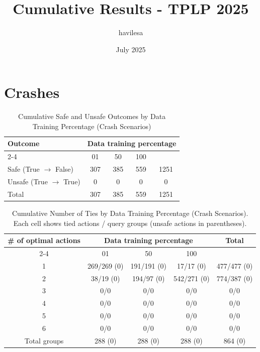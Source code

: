 \documentclass{article}
\title{Cumulative Results - TPLP 2025}
\author{havilesa}
\date{July 2025}
\begin{document}
\maketitle

\section{Crashes}
\begin{table}[h]
\centering
\caption{Cumulative Safe and Unsafe Outcomes by Data Training Percentage (Crash Scenarios)}
\begin{tabular}{l|ccc|c}
\toprule
\multirow{2}{*}{Outcome} & \multicolumn{5}{c|}{Data training percentage} & \multirow{2}{*}{Total} \\
\cmidrule{2-4}
 & 01 & 50 & 100 & \\
\midrule
Safe (True $\rightarrow$ False) & 307 & 385 & 559 & 1251 \\ 
Unsafe (True $\rightarrow$ True) & 0 & 0 & 0 & 0 \\ 
\midrule
Total & 307 & 385 & 559 & 1251 \\ 
\bottomrule
\end{tabular}
\end{table}

\begin{table}[h]
\centering
\caption{Cumulative Number of Ties by Data Training Percentage (Crash Scenarios).
Each cell shows tied actions / query groups (unsafe actions in parentheses).}
\begin{tabular}{c|ccc|c}
\toprule
\multirow{2}{*}{\# of optimal actions} & \multicolumn{3}{c|}{Data training percentage} & \multirow{2}{*}{Total} \\
\cmidrule{2-4}
 & 01 & 50 & 100 & \\
\midrule
1 & 269/269 (0) & 191/191 (0) & 17/17 (0) & 477/477 (0) \\ 
2 & 38/19 (0) & 194/97 (0) & 542/271 (0) & 774/387 (0) \\ 
3 & 0/0 & 0/0 & 0/0 & 0/0 \\ 
4 & 0/0 & 0/0 & 0/0 & 0/0 \\ 
5 & 0/0 & 0/0 & 0/0 & 0/0 \\ 
6 & 0/0 & 0/0 & 0/0 & 0/0 \\ 
\midrule
Total groups & 288 (0) & 288 (0) & 288 (0) & 864 (0) \\ 
\bottomrule
\end{tabular}
\end{table}
\end{document}
